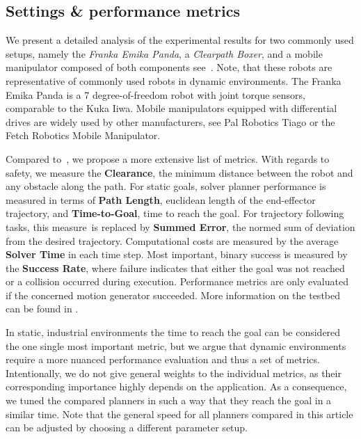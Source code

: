 \subsection{Settings \& performance metrics}%
\label{sub:settings}

We present a detailed analysis of the experimental results for two commonly used setups,
namely the \textit{Franka Emika Panda}, a \textit{Clearpath Boxer}, and a mobile manipulator
composed of both components
see~\cite{Spahn2021}. Note, that these
robots are representative of commonly used robots in dynamic environments. The
Franka Emika Panda is a 7 degree-of-freedom robot with joint torque sensors, comparable to the
Kuka Iiwa. Mobile manipulators equipped with differential drives are widely used by other
manufacturers, see Pal Robotics Tiago or the Fetch Robotics Mobile Manipulator.

Compared to~\cite{Cheng2018}, we propose a more extensive list of metrics.
With regards to safety, we measure the \textbf{Clearance}, the minimum distance
between the robot and any obstacle along the path.
For static goals, solver planner performance is measured in terms of
\textbf{Path Length}, euclidean length of the end-effector trajectory, and
\textbf{Time-to-Goal}, time to reach the goal. For trajectory following tasks,
this measure\ is replaced by \textbf{Summed Error}, the normed sum of deviation
from the desired trajectory. Computational costs are measured by the average
\textbf{Solver Time} in each time step. Most important, binary success is
measured by the \textbf{Success Rate}, where failure indicates that either the
goal was not reached or a collision occurred during execution. Performance
metrics are only evaluated if the concerned motion generator succeeded.
More information on the testbed can be found in \cite{spahn2022local}.
 
In static, industrial environments the time to reach the goal can be considered
the one single most important metric, but we argue that dynamic environments
require a more nuanced performance evaluation and thus a set of metrics.
Intentionally, we do not give general weights to the individual metrics, as
their corresponding importance highly depends on the application. As a
consequence, we tuned the compared planners in such a way that they reach the
goal in a similar time. Note that the general speed for all planners compared
in this article can be adjusted by choosing a different parameter setup.

